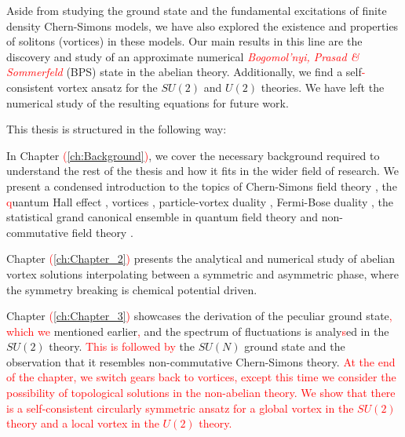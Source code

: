    Aside from studying the ground state and the fundamental excitations of finite density Chern-Simons models, we have also explored the existence and properties of solitons (vortices) in these models. Our main results in this line are the discovery and study of an approximate numerical \textcolor{red}{\textit{Bogomol'nyi, Prasad \& Sommerfeld}} (BPS) state in the abelian theory. Additionally, we find a self\textcolor{red}{-}consistent vortex ansatz for the $SU(2)$ and $U(2)$ theories. We have left the numerical study of the resulting equations for future work.

    This thesis is structured in the following way:

    In Chapter \textcolor{red}{(\ref{ch:Background})}, we cover the necessary background required to understand the rest of the thesis and how it fits in the wider field of research. We present a condensed introduction to the topics of Chern-Simons field theory \textcolor{red}{\cite{Dijkgraaf:1989pz, Deser:1981wh, Dunne:1998qy, Witten:1988hf}}, the \textcolor{red}{q}uantum Hall effect \textcolor{red}{\cite{Tong:2016kpv, Hall1879, vonKlitzing:1980pdk, Landau1930, yoshioka2002the, Girvin, PhysRevLett.48.1559, Laughlin:1983fy}}, vortices \textcolor{red}{\cite{Tong:2005un,PhysRevLett.15.240,shifman2012,Abrikosov1957,Nielsen:1973cs,Paul:1986ix,Hong:1990yh,Jackiw:1990aw,Jackiw:1990pr,Kosterlitz_1973, Berezinsky:1970fr, Berezinsky:1972rfj,Bogomolny:1975de,Prasad:1975kr}}, particle-vortex duality \textcolor{red}{\cite{Peskin:1977kp,Dasgupta:1981zz,Intriligator:1996ex,Murugan:2015boa,Karch:2016sxi,Kapustin:1999ha,Burgess:2000kj,Murugan:2014sfa}}, Fermi-Bose duality \textcolor{red}{\cite{Aharony:2015mjs,Giveon:2008zn, Benini:2011mf, Aharony:2013dha, Aharony:2014uya,Aharony:2012ns,Giombi:2011kc,Jain:2013gza, Gur-Ari:2015pca}}, the statistical grand canonical ensemble in quantum field theory and non-commutative field theory \textcolor{red}{\cite{Polychronakos:2007df, Szabo:2001kg, Douglas:2001ba,Jackiw:2002pn,Snyder:1946qz, Snyder:1947nq,Connes:1994yd,Witten:1985cc,Sen:1986bh,Seiberg:1999vs,Susskind:2001fb,Polychronakos:2001mi}}.

    Chapter \textcolor{red}{(\ref{ch:Chapter_2})} presents the analytical and numerical study of abelian vortex solutions interpolating between a symmetric and asymmetric phase, where the symmetry breaking is chemical potential driven.

    Chapter \textcolor{red}{(\ref{ch:Chapter_3})} showcases the derivation of the peculiar ground state\textcolor{red}{, which we} mentioned earlier\textcolor{red}{,} and the spectrum of fluctuations is analy\textcolor{red}{s}ed in the $SU(2)$ theory. \textcolor{red}{This is followed by} the $SU(N)$ ground state and the observation that it resembles non-commutative Chern-Simons theory. \textcolor{red}{At the end of the chapter, we switch gears back to vortices, except this time we consider the possibility of topological solutions in the non-abelian theory. We show that there is a self-consistent circularly symmetric ansatz for a global vortex in the $SU(2)$ theory and a local vortex in the $U(2)$ theory.}

